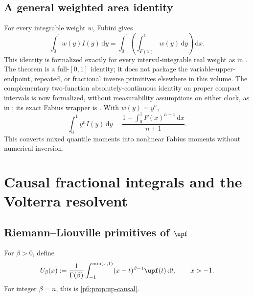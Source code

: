 \documentclass[11pt,oneside]{article}
\theoremstyle{definition}
\theoremstyle{remark}
\newcommand{\dd}{\,\mathrm d}
\newcommand{\1}{\mathbf 1}
\begin{document}
\subsection{A general weighted area identity}

For every integrable weight \(w\), Fubini gives
\begin{equation}
 \int_0^1w(y)I(y)\dd y
 =\int_0^1\left(\int_{F(x)}^1w(y)\dd y\right)\dd x.        \label{p6:eq:weighted-area-inverse}
\end{equation}
This identity is formalized exactly for every interval-integrable real weight as
 in
.  The theorem is a full-\([0,1]\) identity; it does not
package the variable-upper-endpoint, repeated, or fractional inverse primitives elsewhere
in this volume.  The complementary two-function absolutely-continuous identity on proper
compact intervals is now formalized, without measurability assumptions on either clock,
as  in
; its exact Fabius wrapper is
.
With \(w(y)=y^n\),
\begin{equation}
 \int_0^1y^nI(y)\dd y
 =\frac{1-\int_0^1F(x)^{n+1}\dd x}{n+1}.                 \label{p6:eq:inverse-y-moment}
\end{equation}
This converts mixed quantile moments into nonlinear Fabius moments without numerical
inversion.

\section{Causal fractional integrals and the Volterra resolvent}

\subsection{Riemann--Liouville primitives of \(\upf\)}

For \(\beta>0\), define
\begin{equation}
 U_\beta(x):=\frac1{\Gamma(\beta)}
 \int_{-1}^{\min(x,1)}(x-t)^{\beta-1}\upf(t)\dd t,
 \qquad x>-1.                                             \label{p6:eq:fractional-up}
\end{equation}
For integer \(\beta=n\), this is \cref{p6:prop:up-causal}.
\end{document}
